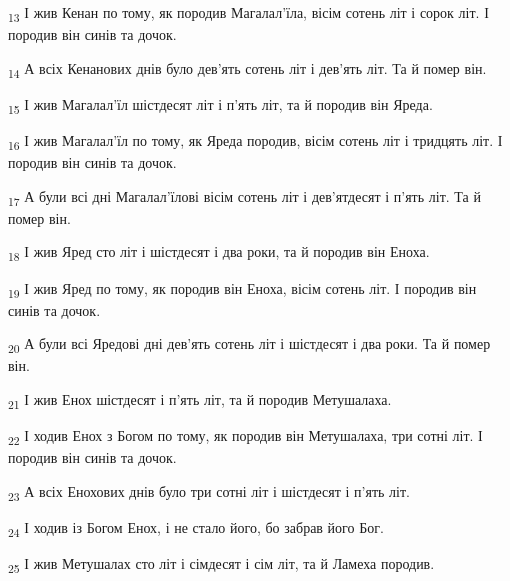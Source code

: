 \begin{tcolorbox}
\textsubscript{13} І жив Кенан по тому, як породив Магалал'їла, вісім сотень літ і сорок літ. І породив він синів та дочок.
\end{tcolorbox}
\begin{tcolorbox}
\textsubscript{14} А всіх Кенанових днів було дев'ять сотень літ і дев'ять літ. Та й помер він.
\end{tcolorbox}
\begin{tcolorbox}
\textsubscript{15} І жив Магалал'їл шістдесят літ і п'ять літ, та й породив він Яреда.
\end{tcolorbox}
\begin{tcolorbox}
\textsubscript{16} І жив Магалал'їл по тому, як Яреда породив, вісім сотень літ і тридцять літ. І породив він синів та дочок.
\end{tcolorbox}
\begin{tcolorbox}
\textsubscript{17} А були всі дні Магалал'їлові вісім сотень літ і дев'ятдесят і п'ять літ. Та й помер він.
\end{tcolorbox}
\begin{tcolorbox}
\textsubscript{18} І жив Яред сто літ і шістдесят і два роки, та й породив він Еноха.
\end{tcolorbox}
\begin{tcolorbox}
\textsubscript{19} І жив Яред по тому, як породив він Еноха, вісім сотень літ. І породив він синів та дочок.
\end{tcolorbox}
\begin{tcolorbox}
\textsubscript{20} А були всі Яредові дні дев'ять сотень літ і шістдесят і два роки. Та й помер він.
\end{tcolorbox}
\begin{tcolorbox}
\textsubscript{21} І жив Енох шістдесят і п'ять літ, та й породив Метушалаха.
\end{tcolorbox}
\begin{tcolorbox}
\textsubscript{22} І ходив Енох з Богом по тому, як породив він Метушалаха, три сотні літ. І породив він синів та дочок.
\end{tcolorbox}
\begin{tcolorbox}
\textsubscript{23} А всіх Енохових днів було три сотні літ і шістдесят і п'ять літ.
\end{tcolorbox}
\begin{tcolorbox}
\textsubscript{24} І ходив із Богом Енох, і не стало його, бо забрав його Бог.
\end{tcolorbox}
\begin{tcolorbox}
\textsubscript{25} І жив Метушалах сто літ і сімдесят і сім літ, та й Ламеха породив.
\end{tcolorbox}
